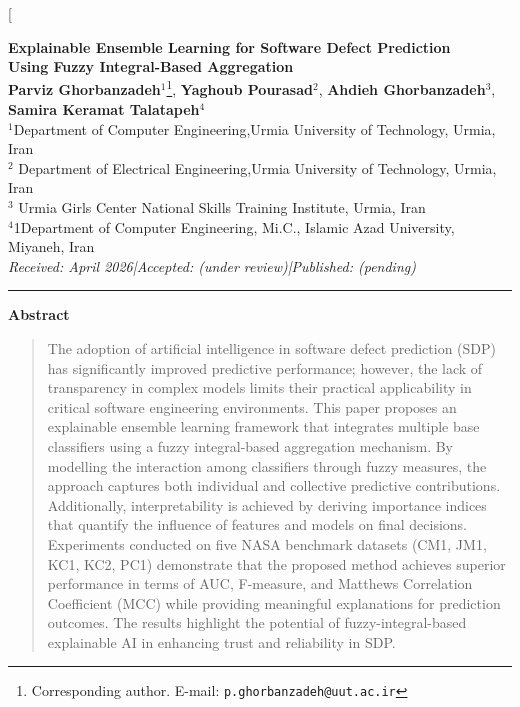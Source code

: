 \documentclass[10pt,twocolumn]{article}
\begin{document}
\twocolumn[{%
\begin{@twocolumnfalse}
  \begin{center}
    {\LARGE\bfseries Explainable Ensemble Learning for Software Defect Prediction\\[4pt]
    Using Fuzzy Integral-Based Aggregation}\\[10pt]
    {\normalsize
      \textbf{Parviz Ghorbanzadeh}$^{1}$\thanks{Corresponding author.
        E-mail: \texttt{p.ghorbanzadeh@uut.ac.ir}},\quad
      \textbf{Yaghoub Pourasad}$^{2}$,\quad
       \textbf{Ahdieh Ghorbanzadeh}$^{3}$,\quad
      \textbf{Samira Keramat Talatapeh}$^{4}$\\[4pt]
      $^{1}$Department of Computer Engineering,Urmia University of Technology, Urmia, Iran\\
     $^{2}$ Department of Electrical Engineering,Urmia University of Technology, Urmia, Iran\\
      $^{3}$ Urmia Girls Center National Skills Training Institute, Urmia, Iran\\
      $^{4}$1Department of Computer Engineering, Mi.C., Islamic Azad University, Miyaneh, Iran
    }\\[8pt]
    {\small\textit{Received: April 2026\quad|\quad Accepted: (under review)\quad|\quad Published: (pending)}}
  \end{center}
  \vspace{6pt}
  \hrule
  \vspace{6pt}


  \begin{center}{\small\bfseries Abstract}\end{center}
  \begin{quote}\small
    The adoption of artificial intelligence in software defect prediction (SDP) has significantly
    improved predictive performance; however, the lack of transparency in complex models limits
    their practical applicability in critical software engineering environments. This paper proposes
    an explainable ensemble learning framework that integrates multiple base classifiers using a
    fuzzy integral-based aggregation mechanism. By modelling the interaction among classifiers
    through fuzzy measures, the approach captures both individual and collective predictive
    contributions. Additionally, interpretability is achieved by deriving importance indices that
    quantify the influence of features and models on final decisions. Experiments conducted on five
    NASA benchmark datasets (CM1, JM1, KC1, KC2, PC1) demonstrate that the proposed method achieves
    superior performance in terms of AUC, F-measure, and Matthews Correlation Coefficient (MCC)
    while providing meaningful explanations for prediction outcomes. The results highlight the
    potential of fuzzy-integral-based explainable AI in enhancing trust and reliability in SDP.
  \end{quote}


\end{@twocolumnfalse}}
\end{document}
